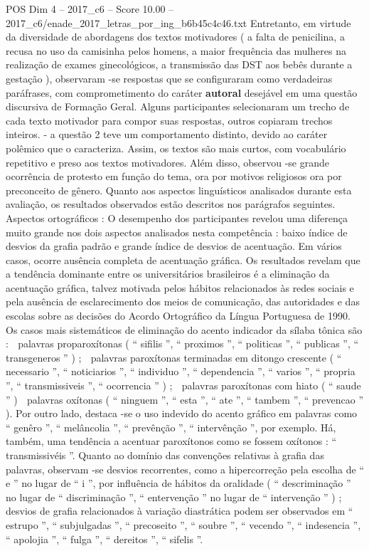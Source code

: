 \begin{textsample}{POS Dim 4 – 2017\_c6 – Score 10.00 – 2017\_c6/enade\_2017\_letras\_por\_ing\_b6b45c4c46.txt}
Entretanto, em virtude da diversidade de abordagens dos textos motivadores ( a falta de penicilina, a recusa no uso da camisinha pelos homens, a maior frequência das mulheres na realização de exames ginecológicos, a transmissão das DST aos bebês durante a gestação ), observaram -se respostas que se configuraram como verdadeiras paráfrases, com comprometimento do caráter \textbf{autoral} desejável em uma questão discursiva de Formação Geral.
Alguns participantes selecionaram um trecho de cada texto motivador para compor suas respostas, outros copiaram trechos inteiros. - a questão 2 teve um comportamento distinto, devido ao caráter polêmico que o caracteriza.
Assim, os textos são mais curtos, com vocabulário repetitivo e preso aos textos motivadores.
Além disso, observou -se grande ocorrência de protesto em função do tema, ora por motivos religiosos ora por preconceito de gênero.
Quanto aos aspectos linguísticos analisados durante esta avaliação, os resultados observados estão descritos nos parágrafos seguintes.
Aspectos ortográficos : O desempenho dos participantes revelou uma diferença muito grande nos dois aspectos analisados nesta competência : baixo índice de desvios da grafia padrão e grande índice de desvios de acentuação.
Em vários casos, ocorre ausência completa de acentuação gráfica.
Os resultados revelam que a tendência dominante entre os universitários brasileiros é a eliminação da acentuação gráfica, talvez motivada pelos hábitos relacionados às redes sociais e pela ausência de esclarecimento dos meios de comunicação, das autoridades e das escolas sobre as decisões do Acordo Ortográfico da Língua Portuguesa de 1990.
Os casos mais sistemáticos de eliminação do acento indicador da sílaba tônica são :  palavras proparoxítonas ( “ sifilis ”, “ proximos ”, “ politicas ”, “ publicas ”, “ transgeneros ” ) ;  palavras paroxítonas terminadas em ditongo crescente ( “ necessario ”, “ noticiarios ”, “ individuo ”, “ dependencia ”, “ varios ”, “ propria ”, “ transmissiveis ”, “ ocorrencia ” ) ;  palavras paroxítonas com hiato ( “ saude ” )  palavras oxítonas ( “ ninguem ”, “ esta ”, “ ate ”, “ tambem ”, “ prevencao ” ).
Por outro lado, destaca -se o uso indevido do acento gráfico em palavras como “ genêro ”, “ melâncolia ”, “ prevênção ”, “ intervênção ”, por exemplo.
Há, também, uma tendência a acentuar paroxítonos como se fossem oxítonos : “ transmissivéis ”.
Quanto ao domínio das convenções relativas à grafia das palavras, observam -se desvios recorrentes, como a hipercorreção pela escolha de “ e ” no lugar de “ i ”, por influência de hábitos da oralidade ( “ descriminação ” no lugar de “ discriminação ”, “ entervenção ” no lugar de “ intervenção ” ) ; desvios de grafia relacionados à variação diastrática podem ser observados em “ estrupo ”, “ subjulgadas ”, “ precoseito ”, “ soubre ”, “ vecendo ”, “ indesencia ”, “ apolojia ”, “ fulga ”, “ dereitos ”, “ sifelis ”.

\end{textsample}
